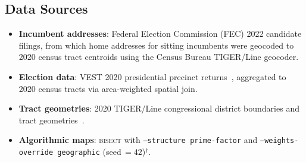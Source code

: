 \subsection{Data Sources}

\begin{itemize}
  \item \textbf{Incumbent addresses}: Federal Election Commission (FEC) 2022 candidate
    filings, from which home addresses for sitting incumbents were geocoded to 2020
    census tract centroids using the Census Bureau TIGER/Line geocoder.
  \item \textbf{Election data}: VEST 2020 presidential precinct returns~\citep{vest2020},
    aggregated to 2020 census tracts via area-weighted spatial join.
  \item \textbf{Tract geometries}: 2020 TIGER/Line congressional district boundaries
    and tract geometries~\citep{census2020tiger}.
  \item \textbf{Algorithmic maps}: \textsc{bisect} with \texttt{--structure prime-factor}
    and \texttt{--weights-override geographic} (seed\,$=42$)$^\dagger$.
\end{itemize}

